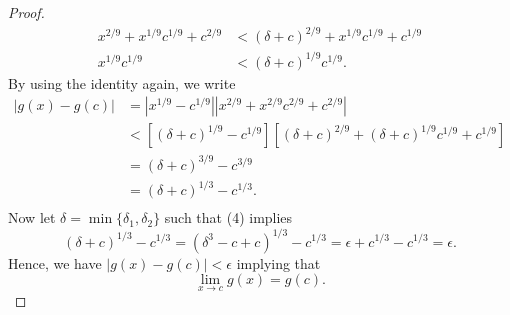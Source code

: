 \begin{enumerate}
\begin{proof}
\begin{align*}
            x^{2/9} +x^{1/9}c^{1/9} + c^{2/9}  &< (\delta + c )^{2/9} + x^{1/9}c^{1/9} + c^{1/9} \tag{2} \\
            x^{1/9} c^{1/9} &< (\delta + c )^{1/9} c^{1/9} \tag{3}.
        \end{align*}
        By using the identity again, we write
        \begin{align*}
            | g(x) - g(c) | &= | x^{1/9} - c^{1/9} | | x^{2/9} + x^{2/9}c^{2/9} + c^{2/9} |  \\
                            &< [(\delta + c)^{1/9} - c^{1/9} ] [(\delta + c )^{2/9} + (\delta + c )^{1/9} c^{1/9} + c^{1/9}] \\
                            &= (\delta + c )^{3/9} - c^{3/9}  \\  
                            &= (\delta + c)^{1/3} - c^{1/3}.  \tag{4} \\
        \end{align*}
        Now let \( \delta = \min \{ \delta_1, \delta_2  \}  \) such that (4) implies
        \[ (\delta + c)^{1/3} - c^{1/3} = (\delta^3 - c + c )^{1/3} - c^{1/3} = \epsilon + c^{1/3} - c^{1/3} = \epsilon. \]
        Hence, we have \( | g(x) - g(c) | < \epsilon  \) implying that
        \[ \lim_{ x \to c } g(x) = g(c). \] 
        \end{proof}
\end{enumerate}

